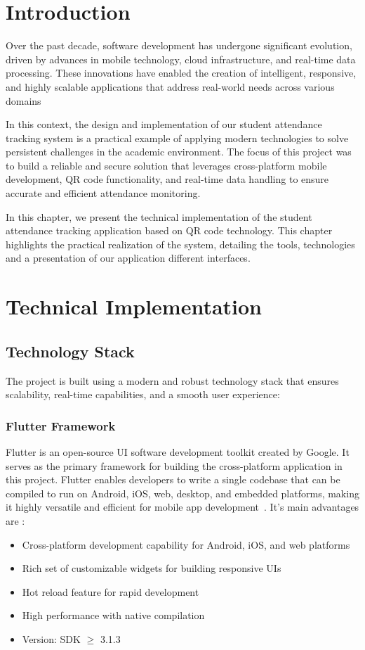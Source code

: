 \section{Introduction}
Over the past decade, software development has undergone significant evolution, driven by advances in mobile technology, cloud infrastructure, and real-time data processing. These innovations have enabled the creation of intelligent, responsive, and highly scalable applications that address real-world needs across various domains

In this context, the design and implementation of our student attendance tracking system is a practical example of applying modern technologies to solve persistent challenges in the academic environment. The focus of this project was to build a reliable and secure solution that leverages cross-platform mobile development, QR code functionality, and real-time data handling to ensure accurate and efficient attendance monitoring.

In this chapter, we present the technical implementation of the student attendance tracking application based on QR code technology. This chapter highlights the practical realization of the system, detailing the tools, technologies and a presentation of our application different interfaces.

\section{Technical Implementation}

\subsection{Technology Stack}
The project is built using a modern and robust technology stack that ensures scalability, real-time capabilities, and a smooth user experience:

\subsubsection{Flutter Framework}
Flutter is an open-source UI software development toolkit created by Google. It serves as the primary framework for building the cross-platform application in this project. Flutter enables developers to write a single codebase that can be compiled to run on Android, iOS, web, desktop, and embedded platforms, making it highly versatile and efficient for mobile app development~\cite{FlutterDocs2024}.
It's main advantages are :
\begin{itemize}
    \item Cross-platform development capability for Android, iOS, and web platforms
    \item Rich set of customizable widgets for building responsive UIs
    \item Hot reload feature for rapid development
    \item High performance with native compilation
    \item Version: SDK $\geq$ 3.1.3
\end{itemize}

